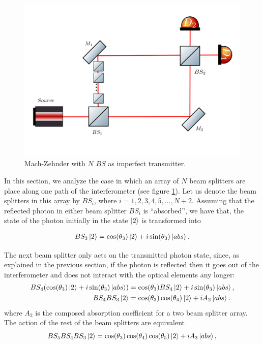 \documentclass[12pt]{book}
\begin{document}
\begin{figure}[H]
\centering
\includegraphics[width=\linewidth,height=8 cm]{images/machzenhderBSS.png}
\caption{Mach-Zehnder with $N$ $BS$ as imperfect transmitter.}
\label{N_bs}
\end{figure}


In this section, we analyze the case in which an array of $N$ beam splitters are place along one path of the interferometer (see figure \ref{N_bs}). Let us denote the beam splitters in this array by $BS_{i}$, where $i=1,2,3,4,5,...,N+2$. Assuming that the reflected photon in either beam splitter $BS_{i}$ is ``absorbed'', we have that, the state of the photon initially in the state $\ket{2}$ is transformed into

\begin{align}
BS_{3}\ket{2}=\cos(\theta_{3})\ket{2}+i\sin(\theta_{3})\ket{abs}.
\end{align}

The next beam splitter only acts on the transmitted photon state, since, as explained in the previous section, if the photon is reflected then it goes out of the interferometer and does not interact with the optical elements any longer:
\begin{align}
BS_{4}(\cos(\theta_{3})\ket{2}+i\sin(\theta_{3})\ket{abs})&=\cos(\theta_{3})BS_{4}\ket{2}+i\sin(\theta_{3})\ket{abs},\\
BS_{4}BS_{3}\ket{2}&=\cos(\theta_{3})\cos(\theta_{4})\ket{2}+i A_{2}\ket{abs}.
\end{align}
where $A_{2}$ is the composed absorption coefficient for a two beam splitter array. The action of the rest of the beam splitters are equivalent
\begin{equation}
BS_{5}BS_{4}BS_{3}\ket{2}=\cos(\theta_{3})\cos(\theta_{4})\cos(\theta_{5})\ket{2}+iA_{3}\ket{abs},
\end{equation}
\end{document}
